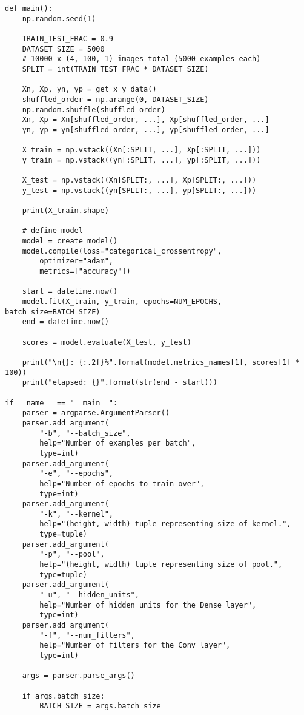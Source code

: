 \documentclass{article}[11pt]
\begin{document}
\begin{verbatim}
def main():
    np.random.seed(1)

    TRAIN_TEST_FRAC = 0.9
    DATASET_SIZE = 5000
    # 10000 x (4, 100, 1) images total (5000 examples each)
    SPLIT = int(TRAIN_TEST_FRAC * DATASET_SIZE)

    Xn, Xp, yn, yp = get_x_y_data()
    shuffled_order = np.arange(0, DATASET_SIZE)
    np.random.shuffle(shuffled_order)
    Xn, Xp = Xn[shuffled_order, ...], Xp[shuffled_order, ...]
    yn, yp = yn[shuffled_order, ...], yp[shuffled_order, ...]

    X_train = np.vstack((Xn[:SPLIT, ...], Xp[:SPLIT, ...]))
    y_train = np.vstack((yn[:SPLIT, ...], yp[:SPLIT, ...]))
    
    X_test = np.vstack((Xn[SPLIT:, ...], Xp[SPLIT:, ...]))
    y_test = np.vstack((yn[SPLIT:, ...], yp[SPLIT:, ...]))

    print(X_train.shape)

    # define model
    model = create_model()
    model.compile(loss="categorical_crossentropy",
        optimizer="adam",
        metrics=["accuracy"])

    start = datetime.now()
    model.fit(X_train, y_train, epochs=NUM_EPOCHS, batch_size=BATCH_SIZE)
    end = datetime.now()

    scores = model.evaluate(X_test, y_test)

    print("\n{}: {:.2f}%".format(model.metrics_names[1], scores[1] * 100))
    print("elapsed: {}".format(str(end - start)))

if __name__ == "__main__":
    parser = argparse.ArgumentParser()
    parser.add_argument(
        "-b", "--batch_size",
        help="Number of examples per batch",
        type=int)
    parser.add_argument(
        "-e", "--epochs",
        help="Number of epochs to train over",
        type=int)
    parser.add_argument(
        "-k", "--kernel",
        help="(height, width) tuple representing size of kernel.",
        type=tuple)
    parser.add_argument(
        "-p", "--pool",
        help="(height, width) tuple representing size of pool.",
        type=tuple)
    parser.add_argument(
        "-u", "--hidden_units",
        help="Number of hidden units for the Dense layer",
        type=int)
    parser.add_argument(
        "-f", "--num_filters",
        help="Number of filters for the Conv layer",
        type=int)

    args = parser.parse_args()

    if args.batch_size:
        BATCH_SIZE = args.batch_size


\end{verbatim}
\end{document}
